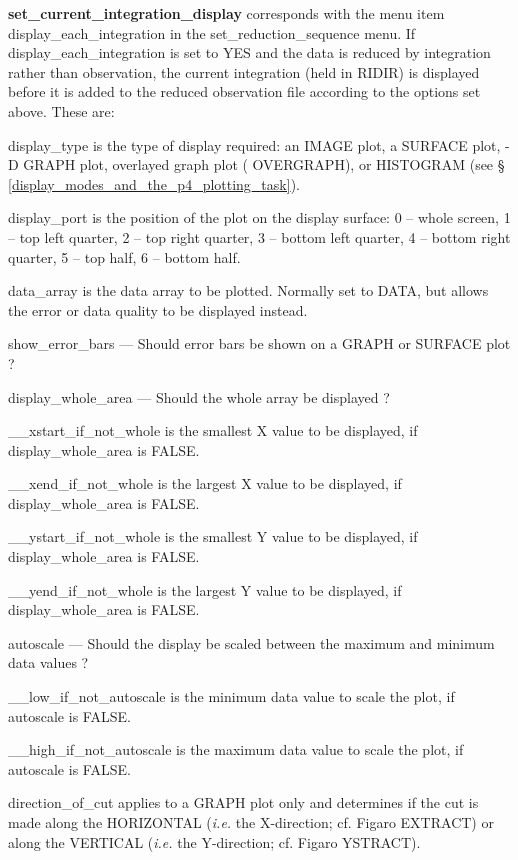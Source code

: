 {{\bf set\_current\_integration\_display} corresponds with the menu item 
{\sf display\_each\_integration} in the {\sf set\_reduction\_sequence} menu. 
If {\sf display\_each\_integration} is set to {\sf YES} and the data
is reduced by integration rather than observation, the current integration
(held in RIDIR) is displayed before it is added to the reduced observation
file according to the options set above. These are:

{\sf display\_type} is the type of display required: an {\sf IMAGE} plot,
a {\sf SURFACE} plot, {-D GRAPH} plot, overlayed graph plot ({\sf 
OVERGRAPH}), or {\sf HISTOGRAM} (see \S 
\ref{display_modes_and_the_p4_plotting_task}).

{\sf display\_port} is the position of the plot on the display surface:
0 -- whole screen, 1 -- top left quarter, 2 -- top right quarter,
3 -- bottom left quarter, 4 -- bottom right quarter, 5 -- top half, 6 
-- bottom half.

{\sf data\_array} is the data array to be plotted. Normally set to {\sf 
DATA}, but allows the error or data quality to be displayed instead.

{\sf show\_error\_bars} --- Should error bars be shown on a GRAPH or 
SURFACE plot ?

{\sf display\_whole\_area} --- Should the whole array be displayed ?

{\sf \_\_xstart\_if\_not\_whole} is the smallest X value to be displayed,
if {\sf display\_whole\_area} is {\sf FALSE}.

{\sf \_\_xend\_if\_not\_whole} is the largest X value to be displayed, 
if {\sf display\_whole\_area} is {\sf FALSE}.

{\sf \_\_ystart\_if\_not\_whole} is the smallest Y value to be displayed,
if {\sf display\_whole\_area} is {\sf FALSE}.

{\sf \_\_yend\_if\_not\_whole} is the largest Y value to be displayed,
if {\sf display\_whole\_area} is {\sf FALSE}.

{\sf autoscale} --- Should the display be scaled between the maximum and 
minimum data values ?

{\sf \_\_low\_if\_not\_autoscale} is the minimum data value to scale the plot,
if {\sf autoscale} is {\sf FALSE}.

{\sf \_\_high\_if\_not\_autoscale} is the maximum data value to scale the plot,
if {\sf autoscale} is {\sf FALSE}.

{\sf direction\_of\_cut} applies to a GRAPH plot only and determines if the 
cut is made along the {\sf HORIZONTAL} ({\em i.e.} the X-direction; cf. Figaro
EXTRACT) or along the {\sf VERTICAL} ({\em i.e.} the Y-direction; cf. Figaro 
YSTRACT). 

}
